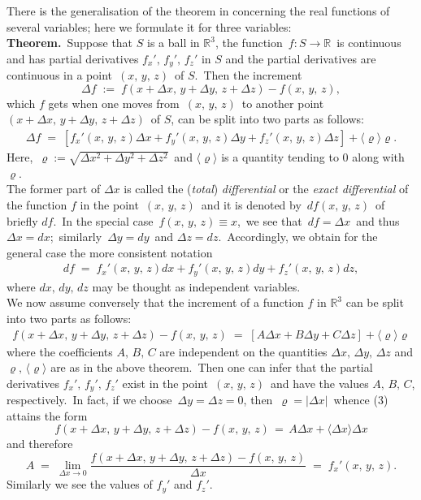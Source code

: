\documentclass[12pt]{article}
\theoremstyle{definition}
\begin{document}
  


There is the generalisation of the theorem in  concerning the real functions of several variables; here we formulate it for three variables:\\

\textbf{Theorem.}\, Suppose that $S$ is a ball in $\mathbb{R}^3$, the function \,$f\!:S\to \mathbb{R}$\, is continuous and has partial derivatives $f_x',\,f_y',\,f_z'$ in $S$ and the partial derivatives are continuous in a point 
\,$(x,\,y,\,z)$\, of $S$.\, Then the increment
$$\Delta f \;:=\; f(x\!+\!\Delta x,\,y\!+\!\Delta y,\,z\!+\!\Delta z)-f(x,\,y,\,z),$$
which $f$ gets when one moves from\, $(x,\,y,\,z)$\, to another point 
\,$(x\!+\!\Delta x,\,y\!+\!\Delta y,\,z\!+\!\Delta z)$\, of $S$, can be split into two parts as follows:
\begin{align}
\Delta f \;=\; [f_x'(x,\,y,\,z)\Delta x+f_y'(x,\,y,\,z)\Delta y+f_z'(x,\,y,\,z)\Delta z]+\langle\varrho\rangle\varrho.
\end{align}
Here,\, $\varrho := \sqrt{\Delta x^2\!+\!\Delta y^2\!+\!\Delta z^2}$\, and $\langle\varrho\rangle$ is a quantity tending to 0 along with $\varrho$.\\


The former part of $\Delta x$ is called the (\emph{total}) \emph{differential} or the \emph{exact differential} of the function $f$ in the point \,$(x,\,y,\,z)$\, and it is denoted by\, $df(x,\,y,\,z)$\, of briefly $df$.\, In the special case \,$f(x,\,y,\,z) \equiv x$,\, we see that\, $df = \Delta x$\, and thus\, $\Delta x = dx$;\, similarly\, 
$\Delta y = dy$\, and $\Delta z = dz$.\, Accordingly, we obtain for the general case the more consistent notation
\begin{align}
df \;=\; f_x'(x,\,y,\,z)dx+f_y'(x,\,y,\,z)dy+f_z'(x,\,y,\,z)dz,
\end{align}
where $dx,\,dy,\,dz$ may be thought as independent variables.\\


We now assume conversely that the increment of a function $f$ in $\mathbb{R}^3$ can be split into two parts as follows:
\begin{align}
f(x\!+\!\Delta x,\,y\!+\!\Delta y,\,z\!+\!\Delta z)-f(x,\,y,\,z) 
\;=\; [A\Delta x+B\Delta y+C\Delta z]+\langle\varrho\rangle\varrho
\end{align}
where the coefficients $A,\,B,\,C$ are independent on the quantities $\Delta x,\,\Delta y,\,\Delta z$ and 
$\varrho,\,\langle\varrho\rangle$ are as in the above theorem.\, Then one can infer that the partial derivatives 
$f_x',\,f_y',\,f_z'$ exist in the point\, $(x,\,y,\,z)$\, and have the values $A,\,B,\,C$, respectively.\, In fact, if we choose\, $\Delta y = \Delta z = 0$, then\, $\varrho = |\Delta x|$\, whence (3) attains the form
$$f(x\!+\!\Delta x,\,y\!+\!\Delta y,\,z\!+\!\Delta z)-f(x,\,y,\,z) \,=\, A\Delta x+\langle\Delta x\rangle\Delta x$$
and therefore 
$$A \;=\; \lim_{\Delta x \to 0}\frac{f(x\!+\!\Delta x,\,y\!+\!\Delta y,\,z\!+\!\Delta z)-f(x,\,y,\,z)}{\Delta x}
\;=\; f_x'(x,\,y,\,z).$$
Similarly we see the values of $f_y'$ and $f_z'$.
\end{document}
